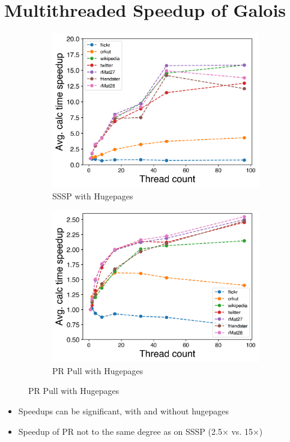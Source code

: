 \documentclass{meetings}
\begin{document}
\section{Multithreaded Speedup of Galois}
\begin{figure}[h!]
\begin{subfigure}{0.45\textwidth}
	\centering
\includegraphics[width=\linewidth]{../../plots/singleNodeSSSPGaloisHPThreads.png}
\caption{SSSP with Hugepages}
\end{subfigure}
\hfil
\begin{subfigure}{0.45\textwidth}
	\centering
\includegraphics[width=\linewidth]{../../plots/singleNodePRPullGaloisHPThreads.png}
		\caption{PR Pull with Hugepages}
	\end{subfigure}
\end{figure}
\begin{itemize}
	\item Speedups can be significant, with and without hugepages
	\item Speedup of PR not to the same degree as on SSSP (2.5$\times$ vs. 15$\times$)
\end{itemize}
\end{document}
